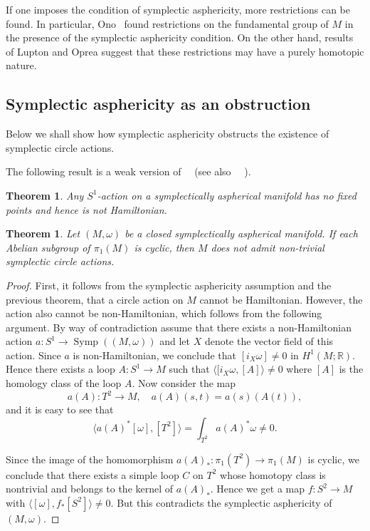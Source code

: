 \documentclass[12pt]{amsart}
\newcommand{\B}[1]{{\mathbb #1}}
\newcommand\R{\B R}
\newtheorem{theorem}[subsection]{Theorem}%
\numberwithin{equation}{section}
\theoremstyle{definition}
\theoremstyle{remark}
\numberwithin{figure}{section}
\numberwithin{table}{section}
\newcommand{\la}{{\lambda}}
\newcommand{\Mo}{(M,\omega )}
\newcommand\Symp{\operatorname{Symp}}
\def\la{\langle}
\def\ra{\rangle}
\begin{document}
If one imposes the condition of symplectic asphericity, more restrictions can  
be found. 
In particular, Ono~\cite{O} found  restrictions on the fundamental group of $M$  
in the presence of the symplectic asphericity condition. On the other hand,  
results of Lupton and Oprea \cite{LO} suggest that these restrictions may have a 
purely homotopic  
nature.  
 
\subsection{Symplectic asphericity as an obstruction} 
Below we shall show how  symplectic asphericity obstructs the existence of 
symplectic circle  
actions. 
 
 
The following result is a weak version of~~\cite[Theorem 4.16]{LO} (see also  
~~\cite{Op}). 
  
\begin{theorem}\label{t:lo} Any $S^1$-action on a symplectically aspherical  
manifold has no fixed points and hence is not Hamiltonian. 
\end{theorem} 
 
 
 
\begin{theorem}\label{t:ono}  
Let $(M,\omega)$ be a closed symplectically aspherical manifold. If each  
Abelian subgroup of $\pi_1(M)$ is cyclic, then $M$ does not admit  non-trivial  
symplectic  circle actions. 
\end{theorem} 
 
\begin{proof} First, it follows from the symplectic asphericity assumption and 
the previous theorem, that a circle  
action on $M$ cannot be Hamiltonian. However,  
the action also cannot be non-Hamiltonian, which follows from the following  
argument. By way of contradiction assume that there exists a non-Hamiltonian  
action $a: S^1\to \Symp(\Mo)$ and let $X$ denote the vector field of this  
action. Since $a$ is non-Hamiltonian, we conclude that $[i_X \omega]\ne 0$ in  
$H^1(M;\R)$. Hence there exists a loop $A: S^1\to M$ such that $\la  
[i_X\omega,[A]\ra\ne 0$ where $[A]$ is the homology class of the loop $A$. Now  
consider the map 
\[ 
a(A): T^2\to M,\quad a(A)(s,t)=a(s)(A(t)), 
\] 
and it is easy to see that 
\[ 
\la a(A)^*[\omega], [T^2]\ra=\int_{T^2}a(A)^*\omega \ne 0. 
\] 
 
Since the image of the homomorphism $a(A)_*:\pi_1(T^2)\to \pi_1(M)$ is cyclic,  
we conclude that there exists a simple loop $C$ on $T^2$ whose homotopy class  
is nontrivial and belongs to the kernel of $a(A)_*$.  
Hence  
we 
get a map $f: S^2 \to M$ with $\la  
[\omega], f_*[S^2]\ra \ne 0$. But this contradicts the symplectic  
asphericity of $\Mo$. 
\end{proof} 
   
\end{document}
